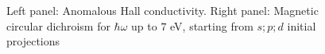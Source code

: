 \begin{itemize}
\begin{figure}[b!]
\centering
{}
\centering
{}
\caption{Left panel: Anomalous Hall conductivity. Right panel: Magnetic circular dichroism for $\hbar\omega$ up to $7$ eV, starting from $s;p;d$ initial projections}\label{fig18.6}
\end{figure}

\end{itemize}
